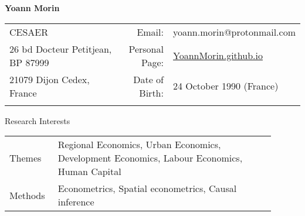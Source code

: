 \documentclass{resume} %
\date{}
\begin{document}
\begin{center}
{\LARGE \textbf{Yoann Morin}}
\end{center}
\vspace*{5mm}
\begin{table}[h]
{\def\arraystretch{1.2}\tabcolsep=0pt
\begin{tabular}{p{0.60\linewidth}p{0.05\linewidth}p{0.35\linewidth}}
  
  CESAER & \multicolumn{1}{r}{Email:\;\;} & \multicolumn{1}{l}{yoann.morin@protonmail.com} \\
  
  26 bd Docteur Petitjean, BP 87999 & \multicolumn{1}{r}{Personal Page:\;\;} &\multicolumn{1}{l}{\href{http://YoannMorin.gitlab.io}{YoannMorin.github.io}} \\
  
  21079 Dijon Cedex, France& \multicolumn{1}{r}{Date of Birth:\;\;} & \multicolumn{1}{l}{{24 October 1990 (France)}} \\
  
  & \multicolumn{1}{r}{ } & \multicolumn{1}{l}{ } \\

\end{tabular}%
}
\end{table}
\begin{rSection}{Research Interests}
\begin{table}[H]
{\def\arraystretch{1.5}\tabcolsep=0pt
\begin{tabular}{p{0.15\linewidth}p{0.75\linewidth}}
Themes &  Regional Economics, Urban Economics, Development Economics, Labour Economics, Human Capital \\
Methods &  Econometrics, Spatial econometrics, Causal inference \\
\end{tabular}%
}
\end{table}
\end{rSection}
\vspace*{-7mm}
\end{document}
